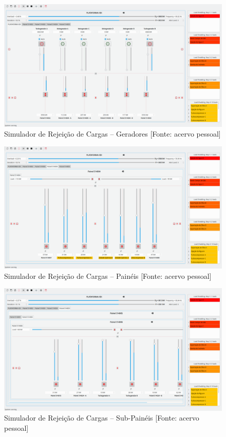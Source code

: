 \begin{figure}
	\centering
	\includegraphics[width=\linewidth]{figuras/simulator_main}
	\caption[Simulador de Rejei{\c c}{\~a}o de Cargas \--- Geradores]{Simulador de Rejei{\c c}{\~a}o de Cargas \--- Geradores [Fonte: acervo pessoal]}
	\label{fig:sim_main}
\end{figure}

\begin{figure}
	\centering
	\includegraphics[width=\linewidth]{figuras/simulator_panels}
	\caption[Simulador de Rejei{\c c}{\~a}o de Cargas \--- Pain{\'e}is]{Simulador de Rejei{\c c}{\~a}o de Cargas \--- Pain{\'e}is [Fonte: acervo pessoal]}
	\label{fig:sim_panels}
\end{figure}

\begin{figure}
	\centering
	\includegraphics[width=\linewidth]{figuras/simulator_subpanels}
	\caption[Simulador de Rejei{\c c}{\~a}o de Cargas \--- Sub-Pain{\'e}is]{Simulador de Rejei{\c c}{\~a}o de Cargas \--- Sub-Pain{\'e}is [Fonte: acervo pessoal]}
	\label{fig:sim_sub}
\end{figure}

